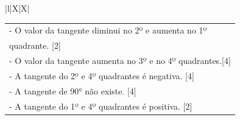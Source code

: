 \begin{xltabular}{\textwidth}{|l|X|X|}
{\begin{tabular}[c]{@{}l@{}}
			
			
			\\- O valor da tangente diminui no 2º e aumenta no 1º \\quadrante. [2]
			\\- O valor da tangente aumenta no 3º e no 4º quadrantes.[4]
			\\- A tangente do 2º e 4º quadrantes é negativa. [4]
			\\- A tangente de 90° não existe. [4]
			\\- A tangente do 1º e 4º quadrantes é positiva. [2]
			
	\end{tabular} }\\ \hline
	 \\ \hline
	 \\ \hline
	 \\ \hline
	 \\ \hline
	\\ \hline
	

\end{xltabular}
